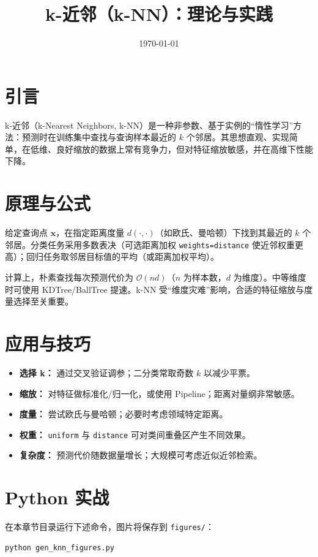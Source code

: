 \documentclass[UTF8,zihao=-4]{ctexart}
\title{k-近邻（k-NN）：理论与实践}
\author{}
\date{\today}
\begin{document}
\maketitle


\section{引言}
k-近邻（k-Nearest Neighbors, k-NN）是一种非参数、基于实例的“惰性学习”方法：预测时在训练集中查找与查询样本最近的 $k$ 个邻居。其思想直观、实现简单，在低维、良好缩放的数据上常有竞争力，但对特征缩放敏感，并在高维下性能下降。

\section{原理与公式}
给定查询点 $\mathbf{x}$，在指定距离度量 $d(\cdot,\cdot)$（如欧氏、曼哈顿）下找到其最近的 $k$ 个邻居。分类任务采用多数表决（可选距离加权 \texttt{weights=distance} 使近邻权重更高）；回归任务取邻居目标值的平均（或距离加权平均）。

计算上，朴素查找每次预测代价为 $\mathcal{O}(nd)$（$n$ 为样本数，$d$ 为维度）。中等维度时可使用 KDTree/BallTree 提速。k-NN 受“维度灾难”影响，合适的特征缩放与度量选择至关重要。

\section{应用与技巧}
\begin{itemize}
  \item \textbf{选择 k：} 通过交叉验证调参；二分类常取奇数 $k$ 以减少平票。
  \item \textbf{缩放：} 对特征做标准化/归一化，或使用 Pipeline；距离对量纲非常敏感。
  \item \textbf{度量：} 尝试欧氏与曼哈顿；必要时考虑领域特定距离。
  \item \textbf{权重：} \texttt{uniform} 与 \texttt{distance} 可对类间重叠区产生不同效果。
  \item \textbf{复杂度：} 预测代价随数据量增长；大规模可考虑近似近邻检索。
\end{itemize}

\section{Python 实战}
在本章节目录运行下述命令，图片将保存到 \texttt{figures/}：
\begin{lstlisting}[style=code,caption={生成 k-NN 配图},label={lst:genfigs_knn_cn}]
python gen_knn_figures.py
\end{lstlisting}
\end{document}
